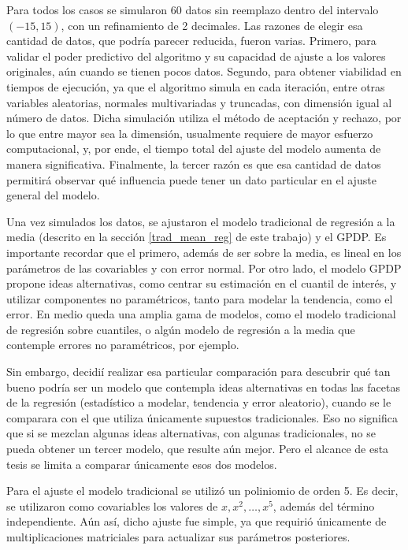 Para todos los casos se simularon 60 datos sin reemplazo dentro del intervalo $(-15,15)$, con un refinamiento de 2 decimales. Las razones de elegir esa cantidad de datos, que podr\'ia parecer reducida, fueron varias. Primero, para validar el poder predictivo del algoritmo y su capacidad de ajuste a los valores originales, aún cuando se tienen pocos datos. Segundo, para obtener viabilidad en tiempos de ejecuci\'on, ya que el algoritmo simula en cada iteraci\'on, entre otras variables aleatorias, normales multivariadas y truncadas, con dimensi\'on igual al n\'umero de datos. Dicha simulaci\'on utiliza el m\'etodo de aceptaci\'on y rechazo, por lo que entre mayor sea la dimensi\'on, usualmente requiere de mayor esfuerzo computacional, y, por ende, el tiempo total del ajuste del modelo aumenta de manera significativa. Finalmente, la tercer raz\'on es que esa cantidad de datos permitir\'a observar qu\'e influencia puede tener un dato particular en el ajuste general del modelo.

Una vez simulados los datos, se ajustaron el modelo tradicional de regresi\'on a la media (descrito en la secci\'on \ref{trad_mean_reg} de este trabajo) y el GPDP. Es importante recordar que el primero, adem\'as de ser sobre la media, es lineal en los  par\'ametros de las covariables y con error normal. Por otro lado, el modelo GPDP propone ideas alternativas, como centrar su estimaci\'on en el cuantil de inter\'es, y utilizar componentes no param\'etricos, tanto para modelar la tendencia, como el error. En medio queda una amplia gama de modelos, como el modelo tradicional de regresi\'on sobre cuantiles, o alg\'un modelo de regresi\'on a la media que contemple errores no param\'etricos, por ejemplo. 

Sin embargo, decidi\'i realizar esa particular comparaci\'on para descubrir qu\'e tan bueno podr\'ia ser un modelo que contempla ideas alternativas en todas las facetas de la regresi\'on (estad\'istico a modelar, tendencia y error aleatorio), cuando se le comparara con el que utiliza \'unicamente supuestos tradicionales. Eso no significa que si se mezclan algunas ideas alternativas, con algunas tradicionales, no se pueda obtener un tercer modelo, que resulte a\'un mejor. Pero el alcance de esta tesis se limita a comparar \'unicamente esos dos modelos.

Para el ajuste el modelo tradicional se utiliz\'o un poliniomio de orden 5. Es decir, se utilizaron como covariables los valores de $x, x^2, \ldots, x^5$, adem\'as del t\'ermino independiente. A\'un as\'i, dicho ajuste fue simple, ya que requiri\'o \'unicamente de multiplicaciones matriciales para actualizar sus par\'ametros posteriores.

